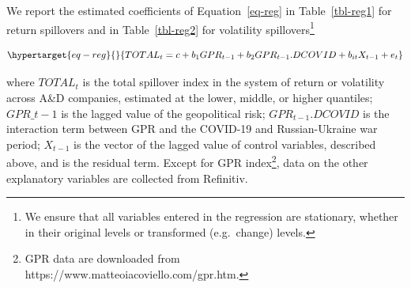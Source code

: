 \documentclass[
  letterpaper,
  DIV=11,
  numbers=noendperiod]{scrartcl}
\begin{document}
We report the estimated coefficients of Equation~\ref{eq-reg} in
Table~\ref{tbl-reg1} for return spillovers and in Table~\ref{tbl-reg2}
for volatility spillovers\footnote{We ensure that all variables entered
  in the regression are stationary, whether in their original levels or
  transformed (e.g.~change) levels.}

\begin{equation}\protect\hypertarget{eq-reg}{}{TOTAL_t=c+b_1GPR_{t-1}+b_2GPR_{t-1}.DCOVID+b_{it}X_{t-1}+e_t}\label{eq-reg}\end{equation}

where \(TOTAL_t\) is the total spillover index in the system of return
or volatility across A\&D companies, estimated at the lower, middle, or
higher quantiles; \(GPR\_{t-1}\) is the lagged value of the geopolitical
risk; \(GPR_{t-1}.DCOVID\) is the interaction term between GPR and the
COVID-19 and Russian-Ukraine war period; \(X_{t-1}\) is the vector of
the lagged value of control variables, described above, and is the
residual term. Except for GPR index\footnote{GPR data are downloaded
  from https://www.matteoiacoviello.com/gpr.htm.}, data on the other
explanatory variables are collected from Refinitiv.
\end{document}

